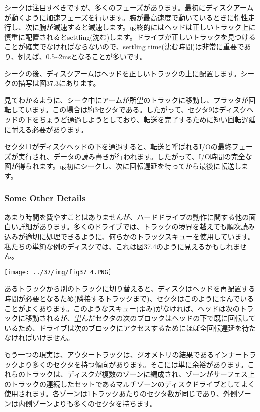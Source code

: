 シークは注目すべきですが、多くのフェーズがあります。最初にディスクアームが動くように加速フェーズを行います。腕が最高速度で動いているときに惰性走行し、次に腕が減速すると減速します。最終的にはヘッドは正しいトラック上に慎重に配置されるとsettling(沈む)します。ドライブが正しいトラックを見つけることが確実でなければならないので、settling
time(沈む時間)は非常に重要であり、例えば、0.5\textasciitilde2msとなることが多いです。

シークの後、ディスクアームはヘッドを正しいトラックの上に配置します。シークの描写は図37.3にあります。

見てわかるように、シーク中にアームが所望のトラックに移動し、プラッタが回転しています。この場合は約3セクタである。したがって、セクタ9はディスクヘッドの下をちょうど通過しようとしており、転送を完了するために短い回転遅延に耐える必要があります。

セクタ11がディスクヘッドの下を通過すると、転送と呼ばれるI/Oの最終フェーズが実行され、データの読み書きが行われます。したがって、I/O時間の完全な図が得られます。最初にシークし、次に回転遅延を待ってから最後に転送します。

\hypertarget{some-other-details}{%
\subsubsection*{Some Other Details}\label{some-other-details}}

あまり時間を費やすことはありませんが、ハードドライブの動作に関する他の面白い詳細があります。多くのドライブでは、トラックの境界を越えても順次読み込みが適切に処理できるように、何らかのトラックスキューを使用しています。私たちの単純な例のディスクでは、これは図37.4のように見えるかもしれません。

\texttt{[image: ../37/img/fig37\_4.PNG]}

あるトラックから別のトラックに切り替えると、ディスクはヘッドを再配置する時間が必要となるため(隣接するトラックまで)、セクタはこのように歪んでいることがよくあります。このようなスキュー(歪み)がなければ、ヘッドは次のトラックに移動されるが、望んだセクタの次のブロックはヘッドの下で既に回転しているため、ドライブは次のブロックにアクセスするためにほぼ全回転遅延を待たなければいけません。

もう一つの現実は、アウタートラックは、ジオメトリの結果であるインナートラックより多くのセクタを持つ傾向があります。そこには単に余裕があります。これらのトラックは、ディスクが複数のゾーンに編成され、ゾーンがサーフェス上のトラックの連続したセットであるマルチゾーンのディスクドライブとしてよく使用されます。各ゾーンは1トラックあたりのセクタ数が同じであり、外側ゾーンは内側ゾーンよりも多くのセクタを持ちます。

